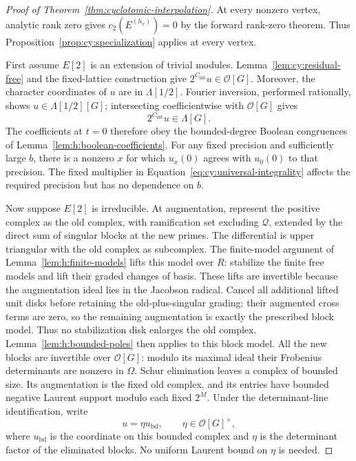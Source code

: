 \begin{proof}[Proof of Theorem~\ref{thm:cyclotomic-interpolation}]
At every nonzero vertex, analytic rank zero gives
$c_2(E^{(h_x)})=0$ by the forward rank-zero theorem. Thus
Proposition~\ref{prop:cy:specialization} applies at every vertex.

First assume $E[2]$ is an extension of trivial modules.
Lemma~\ref{lem:cy:residual-free} and the fixed-lattice construction give
$2^{C_{\mathrm{int}}}u\in\mathcal O[G]$.  Moreover, the character coordinates of $u$
are in $\Lambda[1/2]$.  Fourier inversion, performed rationally, shows
$u\in\Lambda[1/2][G]$; intersecting coefficientwise with
$\mathcal O[G]$ gives
\begin{equation}\label{eq:cy:universal-integrality}
 2^{C_{\mathrm{int}}}u\in\Lambda[G].
\end{equation}
The coefficients at $t=0$ therefore obey the bounded-degree Boolean
congruences of Lemma~\ref{lem:h:boolean-coefficients}. For any fixed
precision and sufficiently large $b$, there is a nonzero $x$ for which
$u_x(0)$ agrees with $u_0(0)$ to that precision.  The fixed multiplier
in Equation~\eqref{eq:cy:universal-integrality} affects the required
precision but has no dependence on $b$.

Now suppose $E[2]$ is irreducible.  At augmentation, represent the
positive complex as the old complex, with ramification set excluding
$\mathcal Q$, extended by the direct sum of singular blocks at the
new primes.  The differential is upper triangular with the old
complex as subcomplex. The finite-model argument of
Lemma~\ref{lem:h:finite-models} lifts this model over $R$: stabilize the
finite free models and lift their graded changes of basis. These lifts
are invertible because the augmentation ideal lies in the Jacobson
radical. Cancel all additional lifted unit disks before retaining the
old-plus-singular grading; their augmented cross terms are zero, so the
remaining augmentation is exactly the prescribed block model. Thus no
stabilization disk enlarges the old complex.
Lemma~\ref{lem:h:bounded-poles} then applies to this block model.  All the new
blocks are invertible over $\mathcal O[G]$: modulo its maximal ideal
their Frobenius determinants are nonzero in $\Omega$.
Schur elimination leaves a complex of bounded size. Its augmentation
is the fixed old complex, and its entries have bounded negative
Laurent support modulo each fixed $2^M$. Under the determinant-line
identification, write
\[
 u=\eta u_{\mathrm{bd}},\qquad \eta\in\mathcal O[G]^\times,
\]
where $u_{\mathrm{bd}}$ is the coordinate on this bounded complex and
$\eta$ is the determinant factor of the eliminated blocks. No uniform
Laurent bound on $\eta$ is needed.


\end{proof}
